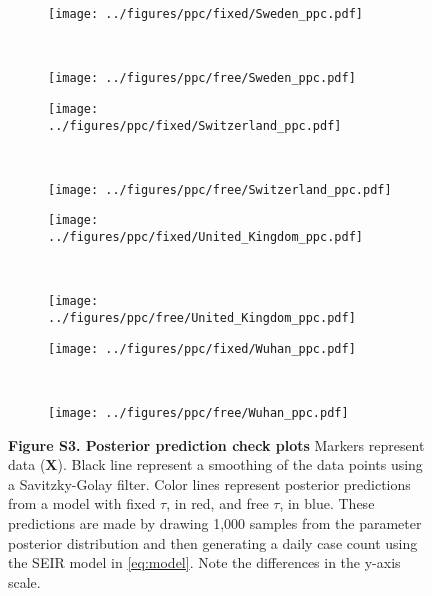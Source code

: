 \documentclass[12pt]{extarticle}
\let\vec\mathbf
\begin{document}
\begin{figure}
    \ContinuedFloat 
    \begin{subfigure}{0.45\textwidth}
        \texttt{[image: ../figures/ppc/fixed/Sweden\_ppc.pdf]}
    \end{subfigure}
    ~
    \begin{subfigure}{0.45\textwidth}
        \texttt{[image: ../figures/ppc/free/Sweden\_ppc.pdf]}
    \end{subfigure}
    \begin{subfigure}{0.45\textwidth}
        \texttt{[image: ../figures/ppc/fixed/Switzerland\_ppc.pdf]}
    \end{subfigure}
    ~
    \begin{subfigure}{0.45\textwidth}
        \texttt{[image: ../figures/ppc/free/Switzerland\_ppc.pdf]}
    \end{subfigure}
    \begin{subfigure}{0.45\textwidth}
        \texttt{[image: ../figures/ppc/fixed/United\_Kingdom\_ppc.pdf]}
    \end{subfigure}
    ~
    \begin{subfigure}{0.45\textwidth}
        \texttt{[image: ../figures/ppc/free/United\_Kingdom\_ppc.pdf]}
    \end{subfigure}
    \begin{subfigure}{0.45\textwidth}
        \texttt{[image: ../figures/ppc/fixed/Wuhan\_ppc.pdf]}
    \end{subfigure}
    ~
    \begin{subfigure}{0.45\textwidth}
        \texttt{[image: ../figures/ppc/free/Wuhan\_ppc.pdf]}
    \end{subfigure}
    \caption{
    \textbf{Figure S3. Posterior prediction check plots}
    Markers represent data ($\vec{X}$). Black line represent a smoothing of the data points using a Savitzky-Golay filter. Color lines represent posterior predictions from a model with fixed $\tau$, in red, and free $\tau$, in blue. These predictions are made by drawing 1,000 samples from the parameter posterior distribution and then generating a daily case count using the SEIR model in \autoref{eq:model}. Note the differences in the y-axis scale.
    }	
\end{figure}
\end{document}
